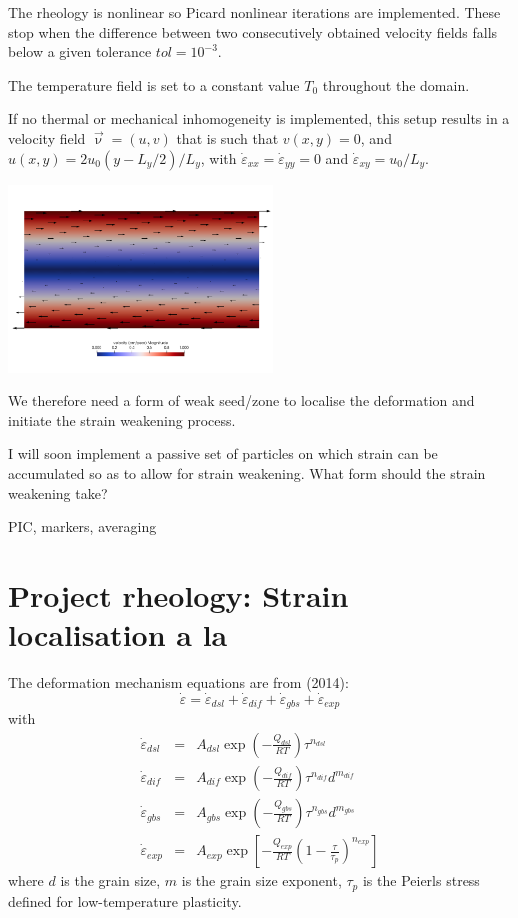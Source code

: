 The rheology is nonlinear so Picard nonlinear iterations are implemented. These stop
when the difference between two consecutively obtained velocity fields falls below
a given tolerance $tol=10^{-3}$. 

The temperature field is set to a constant value $T_0$ throughout the domain.

If no thermal or mechanical inhomogeneity is implemented, this setup results in 
a velocity field $\vec{\upnu}=(u,v)$ that is such that $v(x,y)=0$, and 
$u(x,y)=2u_0 (y-L_y/2)/L_y$, with $\dot{\varepsilon}_{xx}=\dot{\varepsilon}_{yy}=0$ 
and $\dot{\varepsilon}_{xy}=u_0/L_y$. 

\begin{center}
\includegraphics[width=7cm]{python_codes/fieldstone_121/results/vel}
\end{center}

We therefore need a form of weak seed/zone to localise the deformation and 
initiate the strain weakening process.

I will soon implement a passive set of particles on which strain can be accumulated so as 
to allow for strain weakening. What form should the strain weakening take?

PIC, markers, averaging 



\newpage
\section*{Project rheology: Strain localisation a la \textcite{gupr14}}

The deformation mechanism equations are from \textcite{gupr14} (2014):
\[
\dot\varepsilon = \dot\varepsilon_{dsl} + \dot\varepsilon_{dif} + \dot\varepsilon_{gbs} + \dot\varepsilon_{exp} 
\]
with
\begin{eqnarray}
\dot\varepsilon_{dsl}&=&A_{dsl}\exp\left(-\frac{Q_{dsl}}{RT} \right) \tau^{n_{dsl}}  \\
\dot\varepsilon_{dif}&=&A_{dif}\exp\left(-\frac{Q_{dif}}{RT} \right) \tau^{n_{dif}} d^{m_{dif}} \\
\dot\varepsilon_{gbs}&=&A_{gbs}\exp\left(-\frac{Q_{gbs}}{RT} \right) \tau^{n_{gbs}} d^{m_{gbs}} \\
\dot\varepsilon_{exp}&=&A_{exp}\exp\left[-\frac{Q_{exp}}{RT} \left(1 -\frac{\tau}{\tau_p}\right)^{n_{exp}} \right]   
\end{eqnarray}
where $d$ is the grain size, $m$ is the grain size exponent, $\tau_p$ is the Peierls stress defined
for low-temperature plasticity.

